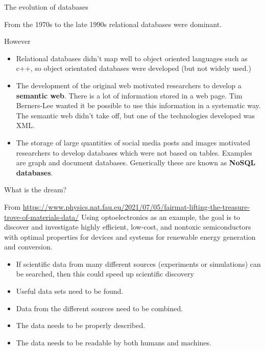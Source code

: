 \documentclass[aspectratio=169,xcolor=dvipsnames]{beamer}
\begin{document}

\begin{frame}{The evolution of databases}

From the 1970s to the late 1990s relational databases were dominant. 

\vspace{1cm}
However
\begin{itemize}
    \item Relational databases didn't map well to object oriented languages such as c++, so object orientated databases were developed (but not widely used.)
\item The development of the original web motivated researchers to develop a \textbf{semantic web}. There is a lot of information stored in a web page.  Tim Berners-Lee wanted it be possible to use this information in a systematic way. The semantic web didn't take off, but one of the technologies developed was XML.

\item The storage of large quantities of social media posts and images motivated researchers to develop databases which were not based on tables.
Examples are graph and document databases. Generically these are known as \textbf{NoSQL databases}.

    
\end{itemize}

\end{frame}

\begin{frame}{What is the dream?} 

From \url{https://www.physics.nat.fau.eu/2021/07/05/fairmat-lifting-the-treasure-trove-of-materials-data/}
Using optoelectronics as an example, the goal is to discover and investigate highly efficient, low-cost, and nontoxic semiconductors with optimal properties for devices and systems for renewable energy generation and conversion.

\vspace{0.5 cm}

\begin{itemize}

\item If scientific data from many different sources (experiments or simulations)  can be searched, then this could speed up scientific discovery

\item Useful data sets need to be found.

\item Data from the different sources need to be combined.

\item The data needs to be properly described.

\item The data needs to be readable by both humans and machines.
\end{itemize}



\end{frame}
\end{document}
